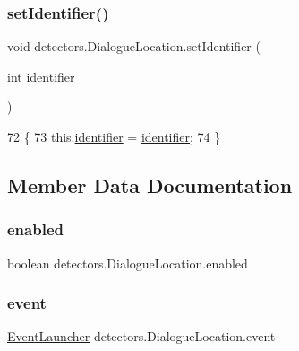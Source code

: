 \subsubsection{\texorpdfstring{set\+Identifier()}{setIdentifier()}}
{\footnotesize\ttfamily void detectors.\+Dialogue\+Location.\+set\+Identifier (\begin{DoxyParamCaption}\item[{int}]{identifier }\end{DoxyParamCaption})\hspace{0.3cm}{\ttfamily [inline]}}


\begin{DoxyCode}
72                                               \{
73         this.\mbox{\hyperlink{classdetectors_1_1_dialogue_location_a27a2a136c8c8b9df94946afcddf90e7d}{identifier}} = \mbox{\hyperlink{classdetectors_1_1_dialogue_location_a27a2a136c8c8b9df94946afcddf90e7d}{identifier}};
74     \}
\end{DoxyCode}


\subsection{Member Data Documentation}
\mbox{\label{classdetectors_1_1_dialogue_location_a724e4fa1eb635dc794cc3a3fde90e947}} 
\subsubsection{\texorpdfstring{enabled}{enabled}}
{\footnotesize\ttfamily boolean detectors.\+Dialogue\+Location.\+enabled\hspace{0.3cm}{\ttfamily [private]}}

\mbox{\label{classdetectors_1_1_dialogue_location_ae8a0a0c1545951d8993d6e192edf22bd}} 
\subsubsection{\texorpdfstring{event}{event}}
{\footnotesize\ttfamily \mbox{\hyperlink{interfaceentities_1_1_event_launcher}{Event\+Launcher}} detectors.\+Dialogue\+Location.\+event\hspace{0.3cm}{\ttfamily [private]}}

